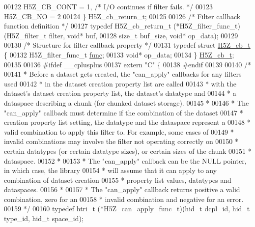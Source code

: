 \begin{DoxyCode}
00122     H5Z\_CB\_CONT   = 1,    \textcolor{comment}{/* I/O continues if filter fails.   */}
00123     H5Z\_CB\_NO     = 2
00124 \} H5Z\_cb\_return\_t;
00125 
00126 \textcolor{comment}{/* Filter callback function definition */}
00127 \textcolor{keyword}{typedef} H5Z\_cb\_return\_t (*H5Z\_filter\_func\_t)(H5Z\_filter\_t filter, \textcolor{keywordtype}{void}* buf,
00128                                 \textcolor{keywordtype}{size\_t} buf\_size, \textcolor{keywordtype}{void}* op\_data);
00129 
00130 \textcolor{comment}{/* Structure for filter callback property */}
00131 \textcolor{keyword}{typedef} \textcolor{keyword}{struct }\hyperlink{struct_h5_z__cb__t}{H5Z\_cb\_t} \{
00132     H5Z\_filter\_func\_t \hyperlink{structfunc}{func};
00133     \textcolor{keywordtype}{void}*              op\_data;
00134 \} \hyperlink{struct_h5_z__cb__t}{H5Z\_cb\_t};
00135 
00136 \textcolor{preprocessor}{#ifdef \_\_cplusplus}
00137 \textcolor{keyword}{extern} \textcolor{stringliteral}{"C"} \{
00138 \textcolor{preprocessor}{#endif}
00139 
00140 \textcolor{comment}{/*}
00141 \textcolor{comment}{ * Before a dataset gets created, the "can\_apply" callbacks for any filters used}
00142 \textcolor{comment}{ * in the dataset creation property list are called}
00143 \textcolor{comment}{ * with the dataset's dataset creation property list, the dataset's datatype and}
00144 \textcolor{comment}{ * a dataspace describing a chunk (for chunked dataset storage).}
00145 \textcolor{comment}{ *}
00146 \textcolor{comment}{ * The "can\_apply" callback must determine if the combination of the dataset}
00147 \textcolor{comment}{ * creation property list setting, the datatype and the dataspace represent a}
00148 \textcolor{comment}{ * valid combination to apply this filter to.  For example, some cases of}
00149 \textcolor{comment}{ * invalid combinations may involve the filter not operating correctly on}
00150 \textcolor{comment}{ * certain datatypes (or certain datatype sizes), or certain sizes of the chunk}
00151 \textcolor{comment}{ * dataspace.}
00152 \textcolor{comment}{ *}
00153 \textcolor{comment}{ * The "can\_apply" callback can be the NULL pointer, in which case, the library}
00154 \textcolor{comment}{ * will assume that it can apply to any combination of dataset creation}
00155 \textcolor{comment}{ * property list values, datatypes and dataspaces.}
00156 \textcolor{comment}{ *}
00157 \textcolor{comment}{ * The "can\_apply" callback returns positive a valid combination, zero for an}
00158 \textcolor{comment}{ * invalid combination and negative for an error.}
00159 \textcolor{comment}{ */}
00160 \textcolor{keyword}{typedef} htri\_t (*H5Z\_can\_apply\_func\_t)(hid\_t dcpl\_id, hid\_t type\_id, hid\_t space\_id);

\end{DoxyCode}

